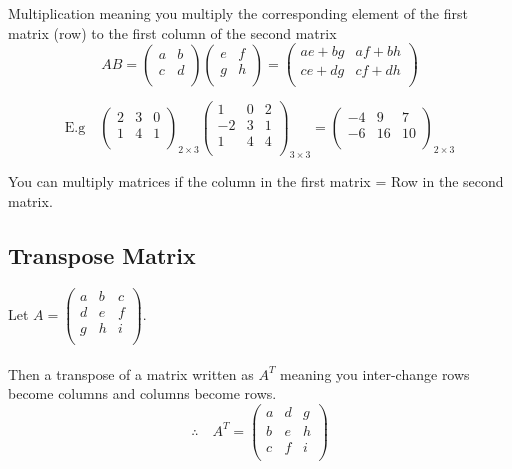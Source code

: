 \documentclass[11pt,a4paper]{article}
\theoremstyle{definition}
\begin{document}
\begin{enumerate}
Multiplication meaning you multiply the corresponding element of the first matrix (row) to the first column of the second matrix\\
$$ AB =
\begin{pmatrix}
a & b\\
c & d\\
\end{pmatrix}
\begin{pmatrix}
e & f\\
g & h\\
\end{pmatrix}
=
\begin{pmatrix}
ae+bg & af+bh\\
ce+dg & cf+dh\\
\end{pmatrix}
$$

$$ \text{E.g}\quad 
\begin{pmatrix}
2 & 3 & 0\\
1 & 4 & 1\\
\end{pmatrix}_{2\times 3}
\begin{pmatrix}
1 & 0 & 2\\
-2 & 3 & 1\\
1 & 4 & 4\\
\end{pmatrix}_{3\times 3}
=
\begin{pmatrix}
-4 & 9 & 7\\
-6 & 16 & 10\\
\end{pmatrix}_{2\times 3}
$$

You can multiply matrices if the column in the first matrix = Row in the second matrix.\\
\end{enumerate}



\subsection{Transpose Matrix}
Let $A=
\begin{pmatrix}
a & b & c\\
d & e & f\\
g & h & i\\
\end{pmatrix}
$.\\\\
Then a transpose of a matrix written as $A^T$ meaning you inter-change rows become columns and columns become rows. 
$$ \therefore \quad  A^T=
\begin{pmatrix}
a & d & g\\
b & e & h\\
c & f & i\\
\end{pmatrix}
$$
\end{document}
